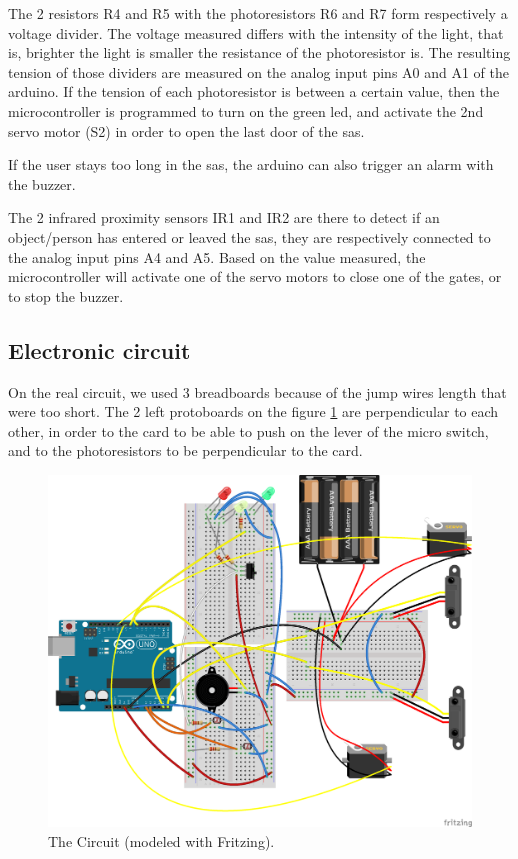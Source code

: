 The 2 resistors R4 and R5 with the photoresistors R6 and R7 form respectively a voltage divider. The voltage measured differs with the intensity of the light, that is, brighter the light is smaller the resistance of the photoresistor is. The resulting tension of those dividers are measured on the analog input pins A0 and A1 of the arduino. If the tension of each photoresistor is between a certain value, then the microcontroller is programmed to turn on the green led, and activate the 2nd servo motor (S2) in order to open the last door of the sas. 

If the user stays too long in the sas, the arduino can also trigger an alarm with the buzzer.

The 2 infrared proximity sensors IR1 and IR2 are there to detect if an object/person has entered or leaved the sas, they are respectively connected to the analog input pins A4 and A5. Based on the value measured, the microcontroller will activate one of the servo motors to close one of the gates, or to stop the buzzer.

\subsection{Electronic circuit}
On the real circuit, we used 3 breadboards because of the jump wires length that were too short. The 2 left protoboards on the figure \ref{circuit} are perpendicular to each other, in order to the card to be able to push on the lever of the micro switch, and to the photoresistors to be perpendicular to the card.

\begin{figure}[!h]
	\centering
    \includegraphics[scale=0.5]{ElectronicScheme2.png}
    \caption{The Circuit (modeled with Fritzing).}
    \label{circuit}
\end{figure}

